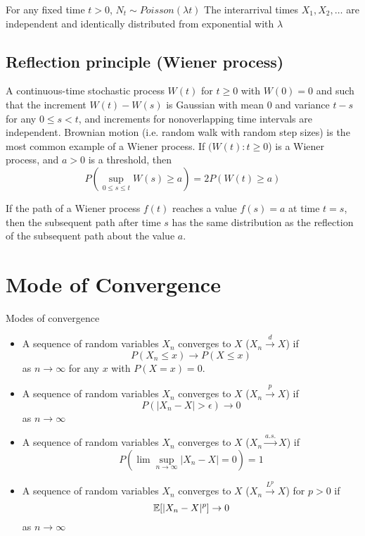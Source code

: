 \documentclass[11pt]{article}
\begin{document}
\theorem
For any fixed time $t > 0$, $N_t \sim Poisson(\lambda t)$
\theorem
The interarrival times $X_1, X_2, \hdots$ are independent and identically distributed from exponential with $\lambda$

\subsection{Reflection principle (Wiener process)}
A continuous-time stochastic process $W(t)$ for $t \geq 0$ with $W(0) = 0$ and such that the increment $W(t) - W(s)$ is Gaussian with mean $0$ and variance $t - s$ for any $0 \leq s < t$, and increments for nonoverlapping time intervals are independent. 
\remark
Brownian motion (i.e. random walk with random step sizes) is the most common example of a Wiener process.
If $(W(t): t \geq 0$) is a Wiener process, and $a > 0$ is a threshold, then
$$P\left( \underset{0 \leq s\leq t}{\sup} W(s) \geq a\right) = 2 P(W(t) \geq a)$$

\remark
If the path of a Wiener process $f(t)$ reaches a value $f(s) = a $ at time $t = s$, then the subsequent path after time $s$ has the same distribution as the reflection of the subsequent path about the value $a$. 


\section{Mode of Convergence}
Modes of convergence
\begin{itemize}
	\item A sequence of random variables $X_n$ converges to $X$  ($X_n \overset{d}{\longrightarrow} X$) if $$P(X_n \leq x) \rightarrow P(X \leq x)$$ as $n \rightarrow \infty$ for any $x$ with $P(X = x) = 0$.
	\item  A sequence of random variables $X_n$ converges to $X$  ($X_n \overset{p}{\longrightarrow} X$) if $$P(|X_n - X| > \epsilon) \rightarrow 0$$ as $n \rightarrow \infty$
	\item A sequence of random variables $X_n$ converges to $X$  ($X_n \overset{a.s.}{\longrightarrow} X$) if $$P(\lim \sup_{n \rightarrow \infty} |X_n - X| = 0) = 1$$
	\item A sequence of random variables $X_n$ converges to $X$  ($X_n \overset{L^p}{\longrightarrow}X$) for $p > 0$ if $$\mathbb{E}[{|X_n - X|^p}] \rightarrow 0$$ as $n \rightarrow \infty$
\end{itemize}
\end{document}
